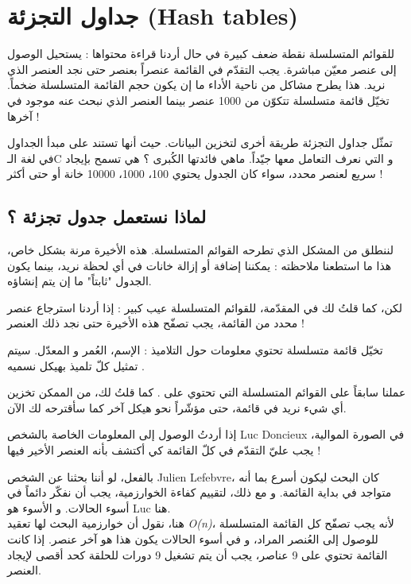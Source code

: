 \chapter{جداول التجزئة (\textenglish{Hash tables})}

للقوائم المتسلسلة نقطة ضعف كبيرة في حال أردنا قراءة محتواها : يستحيل الوصول إلى عنصر معيّن مباشرة. يجب التقدّم في القائمة عنصراً بعنصر حتى نجد العنصر الذي نريد. هذا يطرح مشاكل من ناحية الأداء ما إن يكون حجم القائمة المتسلسلة ضخماً. تخيّل قائمة متسلسلة تتكوّن من 1000 عنصر بينما العنصر الذي نبحث عنه موجود في آخرها !

تمثّل جداول التجزئة طريقة أخرى لتخزين البيانات. حيث أنها تستند على مبدأ الجداول في لغة الـ\textenglish{C}
و التي نعرف التعامل معها جيّداً. ماهي فائدتها الكُبرى ؟ هي تسمح بإيجاد سريع لعنصر محدد، سواء كان الجدول يحتوي 100، 1000، 10000 خانة أو حتى أكثر !

\section{لماذا نستعمل جدول تجزئة ؟}

لننطلق من المشكل الذي تطرحه القوائم المتسلسلة. هذه الأخيرة مرنة بشكل خاص، هذا ما استطعنا ملاحظته : يمكننا إضافة أو إزالة خانات في أي لحظة نريد، بينما يكون الجدول "ثابتاً" ما إن يتم إنشاؤه.

لكن، كما قلتُ لك في المقدّمة، للقوائم المتسلسلة عيب كبير : إذا أردنا استرجاع عنصر محدد من القائمة، يجب تصفّح هذه الأخيرة حتى نجد ذلك العنصر !

تخيّل قائمة متسلسلة تحتوي معلومات حول التلاميذ : الإسم، العُمر و المعدّل. سيتم تمثيل كلّ تلميذ بهيكل نسميه
.

\begin{information}
عملنا سابقاً على القوائم المتسلسلة التي تحتوي على
.
 كما قلتُ لك، من الممكن تخزين أي شيء نريد في قائمة، حتى مؤشّراً نحو هيكل آخر كما سأقترحه لك الآن.
\end{information}

 إذا أردتُ الوصول إلى المعلومات الخاصة بالشخص
\textenglish{Luc Doncieux}
 في الصورة الموالية، يجب عليّ التقدّم في كلّ القائمة كي أكتشف بأنه العنصر الأخير فيها !
 

\begin{information}
بالفعل، لو أننا بحثنا عن الشخص 
\textenglish{Julien Lefebvre}،
كان البحث ليكون أسرع بما أنه متواجد في بداية القائمة. و مع ذلك، لتقييم كفاءة الخوارزمية، يجب أن نفكّر دائماً في أسوء الحالات. و الأسوء هو
\textenglish{Luc}
هنا.\\
هنا، نقول أن خوارزمية البحث لها تعقيد
\textit{\textenglish{O(n)}}،
لأنه يجب تصفّح كل القائمة المتسلسلة للوصول إلى العُنصر المراد، و في أسوء الحالات يكون هذا هو آخر عنصر. إذا كانت القائمة تحتوي على 9 عناصر، يجب أن يتم تشغيل 9 دورات للحلقة كحد أقصى لإيجاد العنصر.
\end{information}

